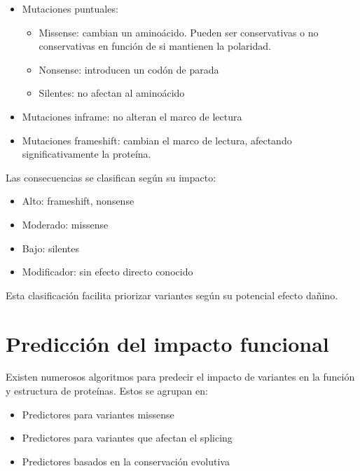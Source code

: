 \begin{itemize}
\item Mutaciones puntuales:
\begin{itemize}
\item Missense: cambian un aminoácido. Pueden ser conservativas o no conservativas en función de si mantienen la polaridad.
\item Nonsense: introducen un codón de parada
\item Silentes: no afectan al aminoácido
\end{itemize}
\item Mutaciones inframe: no alteran el marco de lectura
\item Mutaciones frameshift: cambian el marco de lectura, afectando significativamente la proteína.
\end{itemize}

Las consecuencias se clasifican según su impacto:
\begin{itemize}
\item Alto: frameshift, nonsense
\item Moderado: missense
\item Bajo: silentes
\item Modificador: sin efecto directo conocido
\end{itemize}

Esta clasificación facilita priorizar variantes según su potencial efecto dañino.

\section{Predicción del impacto funcional}
Existen numerosos algoritmos para predecir el impacto de variantes en la función y estructura de proteínas. Estos se agrupan en:
\begin{itemize}
\item Predictores para variantes missense
\item Predictores para variantes que afectan el splicing
\item Predictores basados en la conservación evolutiva
\end{itemize}


